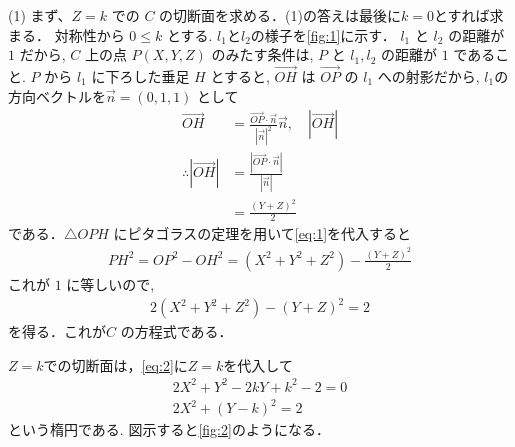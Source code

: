 \documentclass[a4paper,10pt]{ltjsarticle}
\begin{document}
\begin{multicols}{2}
  (1)
  まず、$Z = k$ での $C$ の切断面を求める．(1)の答えは最後に$k=0$とすれば求まる．
  対称性から $0 \le k$ とする.
  $l_1$と$l_2$の様子を\cref{fig:1}に示す．
  $l_1$ と $l_2$ の距離が $1$ だから, $C$ 上の点 $P(X,Y,Z)$ のみたす条件は,
  $P$ と $l_1, l_2$ の距離が $1$ であること.
  $P$ から $l_1$ に下ろした垂足 $H$ とすると,
  $\vec{OH}$ は $\vec{OP}$ の $l_1$ への射影だから,
  $l_1$の方向ベクトルを$\vec{n}=(0,1,1)$ として
  \begin{align}
    \vec{OH}
     & = \frac{\vec{OP} \cdot \vec{n}}{|\vec{n}|^2} \vec{n}, \quad |\vec{OH}| \nonumber \\
    \therefore
    \left|\vec{OH}\right|
     & = \frac{|\vec{OP}\cdot\vec{n}|}{|\vec{n}|}      \nonumber                        \\
     & = \frac{(Y+Z)^2}{2} \label{eq:1}
  \end{align}
  である．$\triangle OPH$ にピタゴラスの定理を用いて\cref{eq:1}を代入すると
  \begin{align*}
    PH^2 = OP^2 - OH^2 = (X^2+Y^2+Z^2) - \frac{(Y+Z)^2}{2}
  \end{align*}
  これが $1$ に等しいので,
  \begin{align}
    2(X^2+Y^2+Z^2) - (Y+Z)^2 = 2 \label{eq:2}
  \end{align}
  を得る．これが$C$ の方程式である．

  $Z=k$での切断面は，\cref{eq:2}に$Z=k$を代入して
  \begin{align}
    2X^2 + Y^2 - 2kY + k^2 - 2 = 0 \nonumber \\
    2X^2 + (Y-k)^2 = 2 \label{eq:3}
  \end{align}
  という楕円である. 図示すると\cref{fig:2}のようになる．

  \begin{figure}[H]
    \centering
\end{figure}
\end{multicols}
\end{document}
